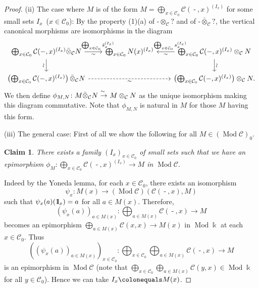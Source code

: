 \documentclass{surv-l}
\numberwithin{equation}{chapter}
\numberwithin{figure}{chapter}
\theoremstyle{plain}
\newtheorem{clm}{Claim}
\theoremstyle{definition}
\theoremstyle{remark}
\newcommand{\id}{1\kern-.25em{\text{{\rm l}}}}
\newcommand{\isoto}{\
  \raise.8ex\hbox{$^{\sim}$}\kern-.7em\hbox{$\to$}\ }
\newcommand{\vsim}{\rotatebox{90}{$\sim$}}
\newcommand{\Ar}[3]{\ar[from={#1}, to={#2}, #3]}
\DeclareMathOperator{\Mod}{Mod}
\DeclareMathOperator{\blank}{-}
\begin{document}
\begin{proof}
(ii) The case where $M$ is of the form $M = \bigoplus_{x \in {\mathcal{C}}_0} {\mathcal{C}}(\blank, x)^{(I_x)}$
for some small sets $I_x$\ ($x\in {\mathcal{C}}_0$):
By the property (1)(a) of $\blank \otimes_{\mathcal{C}} ?$ and of $\blank \bar{\otimes}_{\mathcal{C}} ?$,
the vertical canonical morphisms are isomorphisms in the diagram
{\small\begin{equation*}
\begin{tikzcd}[column sep=2em]
 \bigoplus_{x \in {\mathcal{C}}_0}{\mathcal{C}}(\blank, x)^{(I_x)} \bar{\otimes}_{\mathcal{C}} N \rar["\bigoplus_{x \in {\mathcal{C}}_0}\bar{s}_x^{(I_x)}" near end, "\sim" ']&  \bigoplus_{x \in {\mathcal{C}}_0} N(x)^{(I_x)} &\lar["\bigoplus_{x \in {\mathcal{C}}_0}s_x^{(I_x)}" ' near start, "\sim"]
 \bigoplus_{x \in {\mathcal{C}}_0}{\mathcal{C}}(\blank, x)^{(I_x)} \otimes_{\mathcal{C}} N\\
\left(\bigoplus_{x \in {\mathcal{C}}_0} {\mathcal{C}}(\blank, x)^{(I_x)}\right) \bar{\otimes}_{\mathcal{C}}  N & &  \left(\bigoplus_{x \in {\mathcal{C}}_0}{\mathcal{C}}(\blank, x)^{(I_x)}\right) \otimes_{\mathcal{C}} N.
\Ar{1-1}{2-1}{"\vsim" '}
\Ar{1-3}{2-3}{"\vsim"}
\Ar{2-1}{2-3}{"\sim" ', dashed}
\end{tikzcd}
\end{equation*}}%
We then define $\phi_{M,N}\colon M \bar\otimes_{\mathcal{C}} N \isoto M \otimes_{\mathcal{C}} N$
as the unique isomorphism making this diagram commutative.
Note that $\phi_{M,N}$ is natural in $M$ for those $M$ having this form.

(iii) The general case: First of all we show the following for all $M \in (\Mod{\mathcal{C}})_0$.

\begin{clm}
There exists a family $(I_x)_{x \in {\mathcal{C}}_0}$ of small sets such that
we have an epimorphism
$\phi_M\colon \bigoplus_{x \in {\mathcal{C}}_0}{\mathcal{C}}(\blank, x)^{(I_x)} \to M$
in $\Mod{\mathcal{C}}$.
\end{clm}
Indeed by the Yoneda lemma, for each $x \in {\mathcal{C}}_0$, there exists an isomorphism
\[
\psi_{x} \colon M(x) \to (\Mod{\mathcal{C}})({\mathcal{C}}(\blank, x), M)
\]
such that $\psi_x(a)(\id_x)=a$ for all $a \in M(x)$.
Therefore,
\[
(\psi_x(a))_{a\in M(x)} \colon \bigoplus_{a \in M(x)}{\mathcal{C}}(\blank, x) \to M
\]
becomes an epimorphism
$\bigoplus_{a \in M(x)}{\mathcal{C}}(x, x) \to M(x)$
in $\Mod \Bbbk$ at each $x\in {\mathcal{C}}_0$.
Thus
\[
((\psi_x(a))_{a\in M(x)})_{x \in {\mathcal{C}}_0} \colon \bigoplus_{x \in {\mathcal{C}}_0}\bigoplus_{a \in M(x)}{\mathcal{C}}(\blank, x) \to M
\]
is an epimorphism in $\Mod{\mathcal{C}}$
(note that $\bigoplus_{x \in {\mathcal{C}}_0}\bigoplus_{a \in M(x)}{\mathcal{C}}(y, x) \in \Mod\Bbbk$ for all $y \in {\mathcal{C}}_0$).
Hence we can take $I_x\colonequals  M(x)$.


\end{proof}
\end{document}
